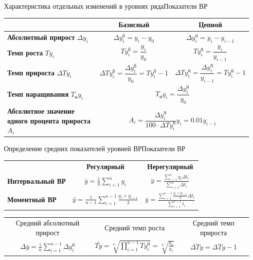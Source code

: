 \documentclass[10pt,pdf,utf8,hyperref={unicode},aspectratio=169]{beamer}
\begin{document}
\begin{frame}{Характеристика отдельных изменений в уровнях ряда}{Показатели ВР}
	\renewcommand{\arraystretch}{2}	
	\begin{tabular}{p{5cm}cc}
		& \textbf{Базисный} & \textbf{Цепной}  \\
	\hline
	\textbf{Абсолютный прирост} $\Delta y_i$ &
		$\Delta y_i^{\text{б}} = y_i-y_0$ & 
		$\Delta y_i^{\text{ц}} = y_i-y_{i-1}$ \\
	\textbf{Темп роста} $T y_i$ & 
		$T y_i^{\text{б}} =\dfrac{y_i}{y_0}$ & 
		$T y_i^{\text{ц}} = \dfrac{y_i}{y_{i-1}}$\\
	\textbf{Темп прироста} $\Delta T y_i$ & 
		$\Delta T y_i^{\text{б}} = \dfrac{\Delta y_i^{\text{б}}}{y_0} = T y_i^{\text{б}}-1$ & 
		$\Delta T y_i^{\text{ц}} = \dfrac{\Delta y_i^{\text{ц}}}{y_{i-1}} = T y_i^{\text{ц}}-1$\\
	\textbf{Темп наращивания} $T_\text{н} y_i$&
	\multicolumn{2}{c}{$T_\text{н} y_i = \dfrac{\Delta y_i^{\text{ц}}}{y_0}$}\\ 
	\textbf{Абсолютное значение одного процента прироста} $A_i$&
	\multicolumn{2}{c}{$A_i =  \dfrac{\Delta y_i^{\text{ц}}}{100 \cdot \Delta T y_i^{\text{ц}}} y_i = 0.01y_{i-1}$}\\ 	
\end{tabular}
\end{frame}

\begin{frame}{Определение средних показателей уровней ВР}{Показатели ВР}
	
	\renewcommand{\arraystretch}{2}	
	\begin{tabular}{lcc}
		& \textbf{Регулярный} & \textbf{Нерегулярный} \\
		\textbf{Интервальный ВР} &
		$\displaystyle \bar{y} = \frac{1}{n}\sum\limits_{i=1}^{n} y_i$
		&
		$\displaystyle \bar{y} = \frac{\sum\limits_{i=1}^{n} y_i \Delta t_i}{\sum\limits_{i=1}^{n} \Delta t_i }$
		\\
		\textbf{Моментный ВР} &
		$\displaystyle \bar{y} = \frac{1}{n-1}\sum\limits_{i=1}^{n-1} \frac{y_i+y_{i+1}}{2}$ &
		$\displaystyle \bar{y} = \frac{\sum\limits_{i=1}^{n-1} \frac{y_i+y_{i+1}}{2} \Delta t_i }{\sum\limits_{i=1}^{n-1} t_i}$
		\\	
	\end{tabular}

	\bigskip

	\renewcommand{\arraystretch}{2}	
	\begin{tabular}{ccc}
		Средний абсолютный прирост & Средний темп роста & Средний темп прироста \\
		$\displaystyle \Delta\bar{y} = \frac{1}{n}\sum\limits_{i=1}^{n-1} \Delta y_i^{\text{ц}}$ &		
		$\displaystyle \overline{T y} = \sqrt[n]{\prod_{i=1}^{n-1} T y_i^{\text{ц}}} = \sqrt[n]{\frac{y_n}{y_1}}$ & 
		$\displaystyle \overline{ \Delta T y} = \overline{ \Delta T y} - 1$
		\\
	\end{tabular}
\end{frame}
\end{document}
